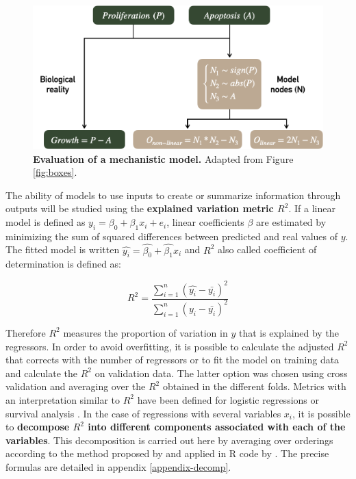\documentclass[a4paper,12pt,twoside,onecolumn,openright,final,oldfontcommands]{memoir}
\begin{document}
\begin{figure}

{\centering \includegraphics[width=0.8\linewidth]{fig/model-simulation} 

}

\caption[Definition of two distinct mechanistic models]{\textbf{Evaluation of a mechanistic model.}
Adapted from Figure \ref{fig:boxes}.}\label{fig:model-simulation}
\end{figure}







The ability of models to use inputs to create or summarize information
through outputs will be studied using the \textbf{explained variation
metric \(R^2\)}. If a linear model is defined as
\(y_i=\beta_0+\beta_1x_i+e_i\), linear coefficients \(\beta\) are
estimated by minimizing the sum of squared differences between predicted
and real values of \(y\). The fitted model is written
\(\hat{y_i}=\hat{\beta_0}+\hat{\beta_1}x_i\) and \(R^2\) also called
coefficient of determination is defined as:

\[R^2=\dfrac{\sum_{i=1}^{n} (\hat{y_i}-\bar{y_i})^2}{\sum_{i=1}^{n}  (y_i-\bar{y_i})^2}\]

Therefore \(R^2\) measures the proportion of variation in \(y\) that is
explained by the regressors. In order to avoid overfitting, it is
possible to calculate the adjusted \(R^2\) that corrects with the number
of regressors or to fit the model on training data and calculate the
\(R^2\) on validation data. The latter option was chosen using cross
validation and averaging over the \(R^2\) obtained in the different
folds. Metrics with an interpretation similar to \(R^2\) have been
defined for logistic regressions or survival analysis
\citep{choodari2012simulation}. In the case of regressions with several
variables \(x_i\), it is possible to \textbf{decompose \(R^2\) into
different components associated with each of the variables}. This
decomposition is carried out here by averaging over orderings according
to the method proposed by \citet{lindeman1980introduction} and applied
in R code by \citet{gromping2006relative}. The precise formulas are
detailed in appendix \ref{appendix-decomp}.
\end{document}
